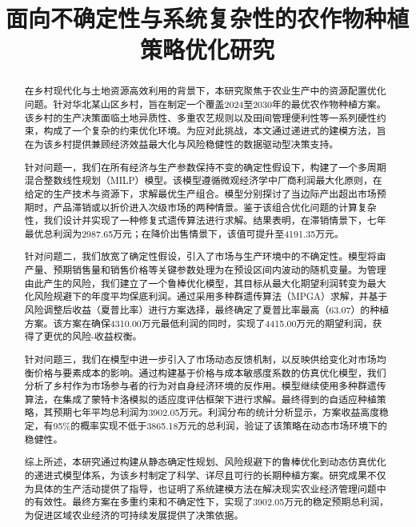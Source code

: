 \documentclass[withoutpreface,bwprint]{cumcmthesis} %
\title{面向不确定性与系统复杂性的农作物种植策略优化研究}
\begin{document}
\maketitle
\begin{abstract}
在乡村现代化与土地资源高效利用的背景下，本研究聚焦于农业生产中的资源配置优化问题。针对华北某山区乡村，旨在制定一个覆盖2024至2030年的最优农作物种植方案。该乡村的生产决策面临土地异质性、多重农艺规则以及田间管理便利性等一系列硬性约束，构成了一个复杂的约束优化环境。为应对此挑战，本文通过递进式的建模方法，旨在为该乡村提供兼顾经济效益最大化与风险稳健性的数据驱动型决策支持。

针对问题一，我们在所有经济与生产参数保持不变的确定性假设下，构建了一个多周期混合整数线性规划（MILP）模型。该模型遵循微观经济学中厂商利润最大化原则，在给定的生产技术与资源下，求解最优生产组合。模型分别探讨了当边际产出超出市场预期时，产品滞销或以折价进入次级市场的两种情景。鉴于该组合优化问题的计算复杂性，我们设计并实现了一种修复式遗传算法进行求解。结果表明，在滞销情景下，七年最优总利润为2987.65万元；在降价出售情景下，该值可提升至4191.35万元。

针对问题二，我们放宽了确定性假设，引入了市场与生产环境中的不确定性。模型将亩产量、预期销售量和销售价格等关键参数处理为在预设区间内波动的随机变量。为管理由此产生的风险，我们建立了一个鲁棒优化模型，其目标从最大化期望利润转变为最大化风险规避下的年度平均保底利润。通过采用多种群遗传算法（MPGA）求解，并基于风险调整后收益（夏普比率）进行方案选择，最终确定了夏普比率最高（63.07）的种植方案。该方案在确保4310.00万元最低利润的同时，实现了4415.00万元的期望利润，获得了更优的风险-收益权衡。

针对问题三，我们在模型中进一步引入了市场动态反馈机制，以反映供给变化对市场均衡价格与要素成本的影响。通过构建基于价格与成本敏感度系数的仿真优化模型，我们分析了乡村作为市场参与者的行为对自身经济环境的反作用。模型继续使用多种群遗传算法，在集成了蒙特卡洛模拟的适应度评估框架下进行求解。最终得到的自适应种植策略，其预期七年平均总利润为3902.05万元。利润分布的统计分析显示，方案收益高度稳定，有95\%的概率实现不低于3865.18万元的总利润，验证了该策略在动态市场环境下的稳健性。

综上所述，本研究通过构建从静态确定性规划、风险规避下的鲁棒优化到动态仿真优化的递进式模型体系，为该乡村制定了科学、详尽且可行的长期种植方案。研究成果不仅为具体的生产活动提供了指导，也证明了系统建模方法在解决现实农业经济管理问题中的有效性。最终方案在多重约束和不确定性下，实现了3902.05万元的稳定预期总利润，为促进区域农业经济的可持续发展提供了决策依据。



\end{abstract}






















\newpage



\newpage
\end{document}
